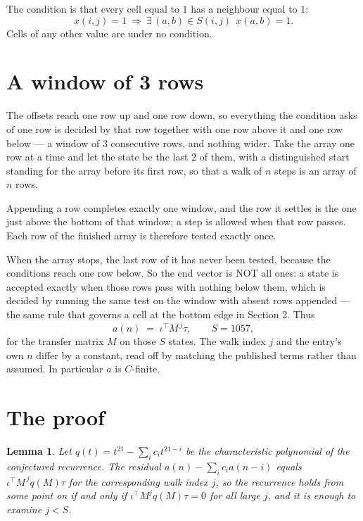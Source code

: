\documentclass[11pt,a4paper]{article}
\theoremstyle{plain}
\newtheorem{lemma}[theorem]{Lemma}
\theoremstyle{definition}
\begin{document}
The condition is that every cell equal to $1$ has a neighbour equal to $1$:
\[
x(i,j)=1\ \Longrightarrow\ \exists\,(a,b)\in S(i,j)\ \ x(a,b)=1 .
\]
Cells of any other value are under no condition.

\section{A window of 3 rows}

The offsets reach one row up and one row down, so everything the condition asks of one row is
decided by that row together with one row above it and one row below --- a window of
$3$ consecutive rows, and nothing wider. Take the array one row at a time and
let the state be the last 2 of them, with a distinguished start standing for the array before its
first row, so that a walk of $n$ steps is an array of $n$ rows.

Appending a row completes exactly one window, and the row it settles is the one just above the bottom of that window; a step is
allowed when that row passes. Each row of the finished array is therefore tested exactly once.

When the array stops, the last row of it has never been tested, because the
conditions reach one row below. So the end vector is NOT all ones: a state is accepted exactly when
those rows pass with nothing below them, which is decided by running the same test on the window
with absent rows appended --- the same rule that governs a cell at the bottom edge in
Section 2.
Thus
\[
a(n)\;=\;\iota^{\!\top}M^{\,j}\tau ,\qquad S=1057,
\]
for the transfer matrix $M$ on those $S$ states. The walk index $j$ and the entry's own $n$
differ by a constant, read off by matching the published terms rather than assumed. In
particular $a$ is $C$-finite.

\section{The proof}

\begin{lemma}\label{lem:crit}
Let $q(t)=t^{21}-\sum_i c_it^{21-i}$ be the characteristic polynomial of the
conjectured recurrence. The residual $a(n)-\sum_ic_ia(n-i)$ equals
$\iota^{\!\top}M^{\,j}q(M)\tau$ for the corresponding walk index $j$, so the recurrence
holds from some point on if and only if $\iota^{\!\top}M^{j}q(M)\tau=0$ for all large $j$,
and it is enough to examine $j<S$.
\end{lemma}
\end{document}
